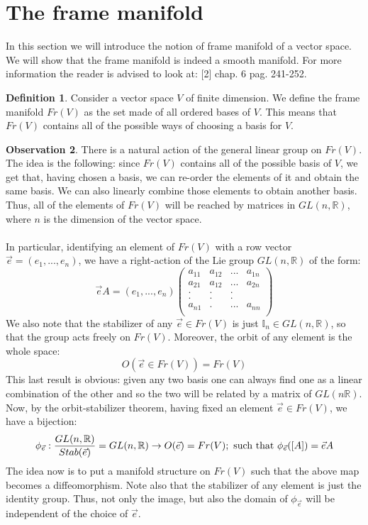 \documentclass[12pt,a4paper]{report}
\theoremstyle{definition}
\newtheorem{Def}{Definition}[chapter]
\theoremstyle{Theorem}
\theoremstyle{definition}
\theoremstyle{definition}
\newtheorem{Obs}[Def]{Observation}
\begin{document}
	\section{The frame manifold}
	In this section we will introduce the notion of frame manifold of a vector space. We will show that the frame manifold is indeed a smooth manifold. For more information the reader is advised to look at: [2] chap. 6 pag. 241-252.
	\begin{Def}\label{Def_6.5}
		Consider a vector space $V$ of finite dimension. We define the frame manifold $Fr(V)$ as the set made of all ordered bases of $V$. This means that $Fr(V)$ contains all of the possible ways of choosing a basis for $V$.
	\end{Def}
	\begin{Obs}
		There is a natural action of the general linear group on $Fr(V)$. The idea is the following: since $Fr(V)$ contains all of the possible basis of $V$, we get that, having chosen a basis, we can re-order the elements of it and obtain the same basis. We can also linearly combine those elements to obtain another basis. Thus, all of the elements of $Fr(V)$ will be reached by matrices in $GL(n,\mathbb{R})$, where $n$ is the dimension of the vector space.\\
		\\
		In particular, identifying an element of $Fr(V)$ with a row vector $\vec{e}=(e_1,...,e_n)$, we have a right-action of the Lie group $GL(n,\mathbb{R})$ of the form:
		$$\vec{e}A=(e_1,...,e_n)\begin{pmatrix}
			a_{11}&a_{12}&...&a_{1n}\\
			a_{21}&a_{12}&...&a_{2n}\\
			.     &.     &.   &     \\
			.     &.     &.   &     \\
			a_{n1}&.     &...&a_{nn}\\
		\end{pmatrix}$$
		We also note that the stabilizer of any $\vec{e}\in Fr(V)$ is just $\mathbb{I}_n\in GL(n,\mathbb{R})$, so that the group acts freely on $Fr(V)$. Moreover, the orbit of any element is the whole space: 
		$$O(\vec{e}\in Fr(V))=Fr(V)$$
		This last result is obvious: given any two basis one can always find one as a linear combination of the other and so the two will be related by a matrix of $GL(n\mathbb{R})$.
		Now, by the orbit-stabilizer theorem, having fixed an element $\vec{e}\in Fr(V)$, we have a bijection:
		$$\phi_{\vec{e}}:{GL(n,\mathbb{R})\over Stab(\vec{e})}=GL(n,\mathbb{R})\rightarrow O(\vec{e})=Fr(V);\hbox{ such that } \phi_{\vec{e}}([A])=\vec{e}A$$
		The idea now is to put a manifold structure on $Fr(V)$ such that the above map becomes a diffeomorphism. Note also that the stabilizer of any element is just the identity group. Thus, not only the image, but also the domain of $\phi_{\vec{e}}$ will be independent of the choice of $\vec{e}$.
	\end{Obs}
\end{document}
